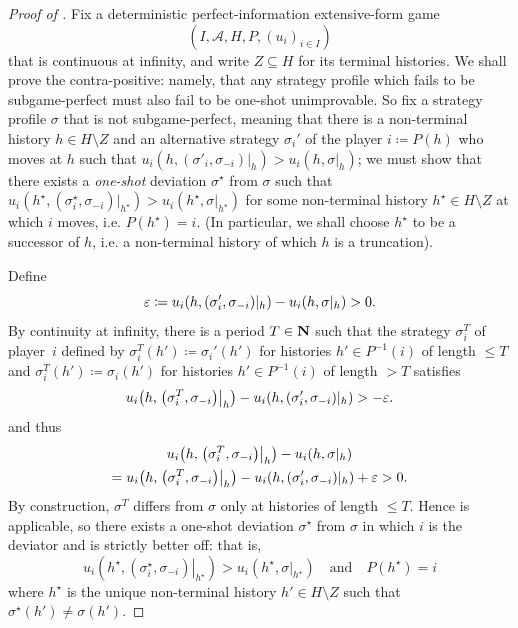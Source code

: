 \begin{proof}[Proof of ]
	Fix a deterministic perfect-information extensive-form game
	\begin{equation*}
		(I,\mathcal{A},H,P,(u_i)_{i \in I}) 
	\end{equation*}
	that is continuous at infinity, and write $Z \subseteq H$ for its terminal histories. We shall prove the contra-positive: namely, that any strategy profile which fails to be subgame-perfect must also fail to be one-shot unimprovable. So fix a strategy profile $\sigma$ that is not subgame-perfect, meaning that there is a non-terminal history $h \in H \setminus Z$ and an alternative strategy $\sigma_i'$ of the player $i \coloneqq P(h)$ who moves at $h$ such that $u_i(h,(\sigma'_i,\sigma_{-i})|_h) > u_i(h,\sigma|_h)$; we must show that there exists a \emph{one-shot} deviation $\sigma^\star$ from $\sigma$ such that $u_i(h^\star,(\sigma^\star_i,\sigma_{-i})|_{h^\star}) > u_i(h^\star,\sigma|_{h^\star})$ for some non-terminal history $h^\star \in H \setminus Z$ at which $i$ moves, i.e. $P(h^\star)=i$. (In particular, we shall choose $h^\star$ to be a successor of $h$, i.e. a non-terminal history of which $h$ is a truncation).

	Define
	\begin{equation*}
		\varepsilon \coloneqq u_i(h,(\sigma'_i,\sigma_{-i})|_h) - u_i(h,\sigma|_h) > 0 .
	\end{equation*}
	By continuity at infinity, there is a period $T \in \mathbf{N}$ such that the strategy $\sigma_i^T$ of player~$i$ defined by $\sigma_i^T(h') \coloneqq \sigma_i'(h')$ for histories $h' \in P^{-1}(i)$ of length $\leq T$ and $\sigma_i^T(h') \coloneqq \sigma_i(h')$ for histories $h' \in P^{-1}(i)$ of length $> T$ satisfies
	\begin{equation*}
		u_i\left(h,\left.\left(\sigma^T_i,\sigma_{-i}\right)\right|_h\right) 
		- u_i(h,(\sigma_i',\sigma_{-i})|_h)
		> - \eps .
	\end{equation*}
	and thus
	\begin{multline*}
		u_i\left(h,\left.\left(\sigma^T_i,\sigma_{-i}\right)\right|_h\right)
		- u_i(h,\sigma|_h) 
		\\
		= u_i\left(h,\left.\left(\sigma^T_i,\sigma_{-i}\right)\right|_h\right)
		- u_i(h,(\sigma_i',\sigma_{-i})|_h) 
		+ \eps
		> 0 .
	\end{multline*}
	By construction, $\sigma^T$ differs from $\sigma$ only at histories of length $\leq T$. Hence  is applicable, so there exists a one-shot deviation $\sigma^\star$ from $\sigma$ in which $i$ is the deviator and is strictly better off: that is,
	\begin{equation*}
		u_i\left(h^\star,\left.\left(\sigma^\star_i,\sigma_{-i}\right)\right|_{h^\star}\right)
		> u_i(h^\star,\sigma|_{h^\star})
		\quad \text{and} \quad
		P(h^\star)=i
	\end{equation*}
	where $h^\star$ is the unique non-terminal history $h' \in H \setminus Z$ such that $\sigma^\star(h') \neq \sigma(h')$.
\end{proof}



